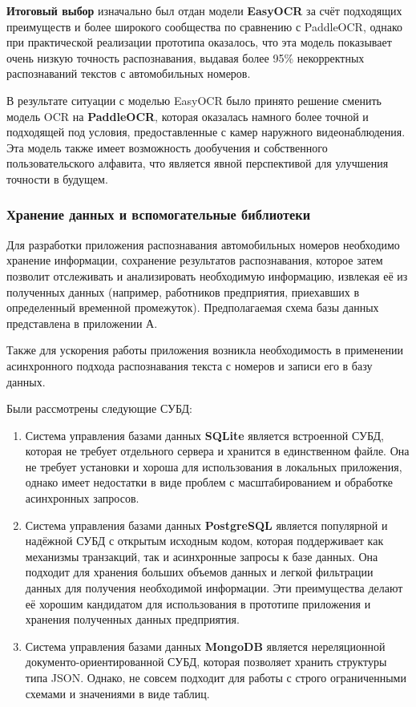 \documentclass[a4paper,12pt]{article}
\begin{document}
\textbf{Итоговый выбор} изначально был отдан модели \textbf{EasyOCR} за счёт подходящих преимуществ и более широкого сообщества по сравнению с PaddleOCR, однако при практической реализации прототипа оказалось, что эта модель показывает очень низкую точность распознавания, выдавая более 95\% некорректных распознаваний текстов с автомобильных номеров.

В результате ситуации с моделью EasyOCR было принято решение сменить модель OCR на \textbf{PaddleOCR}, которая оказалась намного более точной и подходящей под условия, предоставленные с камер наружного видеонаблюдения. Эта модель также имеет возможность дообучения и собственного пользовательского алфавита, что является явной перспективой для улучшения точности в будущем.

\subsubsection{Хранение данных и вспомогательные библиотеки}

Для разработки приложения распознавания автомобильных номеров необходимо хранение информации, сохранение результатов распознавания, которое затем позволит отслеживать и анализировать необходимую информацию, извлекая её из полученных данных (например, работников предприятия, приехавших в определенный временной промежуток). Предполагаемая схема базы данных представлена в приложении А.

Также для ускорения работы приложения возникла необходимость в применении асинхронного подхода распознавания текста с номеров и записи его в базу данных.

Были рассмотрены следующие СУБД:
\begin{enumerate}
    \item Система управления базами данных \textbf{SQLite} является встроенной СУБД, которая не требует отдельного сервера и хранится в единственном файле. Она не требует установки и хороша для использования в локальных приложения, однако имеет недостатки в виде проблем с масштабированием и обработке асинхронных запросов.
    \item Система управления базами данных \textbf{PostgreSQL} является популярной и надёжной СУБД с открытым исходным кодом, которая поддерживает как механизмы транзакций, так и асинхронные запросы к базе данных. Она подходит для хранения больших объемов данных и легкой фильтрации данных для получения необходимой информации. Эти преимущества делают её хорошим кандидатом для использования в прототипе приложения и хранения полученных данных предприятия.
    \item Система управления базами данных \textbf{MongoDB} является нереляционной документо-ориентированной СУБД, которая позволяет хранить структуры типа JSON. Однако, не совсем подходит для работы с строго ограниченными схемами и значениями в виде таблиц.
\end{enumerate}
\end{document}
